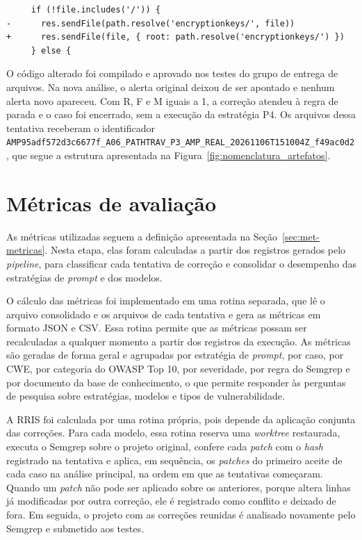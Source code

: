 {\footnotesize
\begin{verbatim}
     if (!file.includes('/')) {
-      res.sendFile(path.resolve('encryptionkeys/', file))
+      res.sendFile(file, { root: path.resolve('encryptionkeys/') })
     } else {
\end{verbatim}
}

O código alterado foi compilado e aprovado nos testes do grupo de entrega de arquivos. Na nova análise, o alerta original deixou de ser apontado e nenhum alerta novo apareceu. Com R, F e M iguais a 1, a correção atendeu à regra de parada e o caso foi encerrado, sem a execução da estratégia P4. Os arquivos dessa tentativa receberam o identificador \texttt{AMP95adf572d3c6677f\_\allowbreak A06\_\allowbreak PATHTRAV\_\allowbreak P3\_\allowbreak AMP\_\allowbreak REAL\_\allowbreak 20261106T151004Z\_\allowbreak f49ac0d2}, que segue a estrutura apresentada na Figura~\ref{fig:nomenclatura_artefatos}.

\section{Métricas de avaliação}
\label{sec:impl-metricas}

As métricas utilizadas seguem a definição apresentada na Seção~\ref{sec:met-metricas}. Nesta etapa, elas foram calculadas a partir dos registros gerados pelo \textit{pipeline}, para classificar cada tentativa de correção e consolidar o desempenho das estratégias de \textit{prompt} e dos modelos.

O cálculo das métricas foi implementado em uma rotina separada, que lê o arquivo consolidado e os arquivos de cada tentativa e gera as métricas em formato JSON e CSV. Essa rotina permite que as métricas possam ser recalculadas a qualquer momento a partir dos registros da execução. As métricas são geradas de forma geral e agrupadas por estratégia de \textit{prompt}, por caso, por CWE, por categoria do OWASP Top 10, por severidade, por regra do Semgrep e por documento da base de conhecimento, o que permite responder às perguntas de pesquisa sobre estratégias, modelos e tipos de vulnerabilidade.

A RRIS foi calculada por uma rotina própria, pois depende da aplicação conjunta das correções. Para cada modelo, essa rotina reserva uma \textit{worktree} restaurada, executa o Semgrep sobre o projeto original, confere cada \textit{patch} com o \textit{hash} registrado na tentativa e aplica, em sequência, os \textit{patches} do primeiro aceite de cada caso na análise principal, na ordem em que as tentativas começaram. Quando um \textit{patch} não pode ser aplicado sobre os anteriores, porque altera linhas já modificadas por outra correção, ele é registrado como conflito e deixado de fora. Em seguida, o projeto com as correções reunidas é analisado novamente pelo Semgrep e submetido aos testes.

